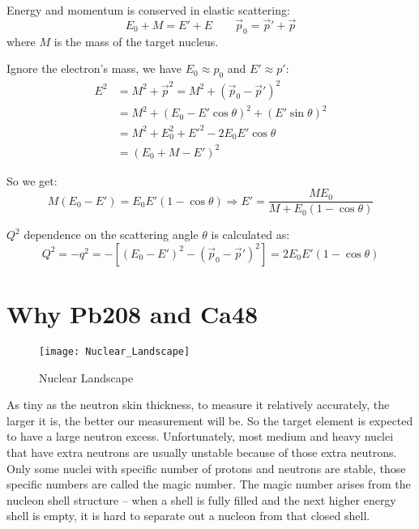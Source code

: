 Energy and momentum is conserved in elastic scattering:
$$ E_0 + M = E' + E \qquad \vec{p}_0 = \vec{p}' + \vec{p} $$
where $M$ is the mass of the target nucleus.

Ignore the electron's mass, we have $E_0 \approx p_0$ and $E' \approx p'$:
\begin{equation}
    \begin{aligned}
	E^2 &= M^2 + \vec{p}^2 = M^2 + (\vec{p}_0 - \vec{p}')^2  \\
	    &= M^2 + (E_0 - E'\cos\theta)^2 + (E'\sin\theta)^2	\\
	    &= M^2 + E_0^2 + E'^2 - 2E_0E'\cos\theta	\\
	    &= (E_0 + M - E')^2
    \end{aligned}
\end{equation}

So we get:
\begin{equation}
    M(E_0 - E') = E_0E'(1-\cos\theta)   \Longrightarrow
    E' = \frac{ME_0}{M + E_0(1-\cos\theta)}
\label{eq:scattered_energy}
\end{equation}

$Q^2$ dependence on the scattering angle $\theta$ is calculated as:
\begin{equation}
    Q^2 = -q^2 = -[(E_0 - E')^2 - (\vec{p}_0 - \vec{p}')^2] = 2E_0E'(1-\cos\theta)
    \label{eq:Q2}
\end{equation}

\section{Why Pb208 and Ca48}
\begin{figure}[H]
    \centering
    \texttt{[image: Nuclear\_Landscape]}
    \caption{Nuclear Landscape}
    \label{fig:nuclear_landscape}
\end{figure}
As tiny as the neutron skin thickness, to measure it relatively accurately, the
larger it is, the better our measurement will be. So the target element is expected to
have a large neutron excess. Unfortunately, most medium and heavy nuclei that
have extra neutrons are usually unstable because of those extra neutrons. Only
some nuclei with specific number of protons and neutrons are stable, those specific
numbers are called the magic number. The magic number arises from the nucleon 
shell structure -- when a shell is fully filled and the next higher energy shell 
is empty, it is hard to separate out a nucleon from that closed shell.

